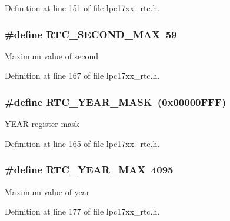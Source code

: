 \-Definition at line 151 of file lpc17xx\-\_\-rtc.\-h.

\hypertarget{group___r_t_c___private___macros_ga60bbeee3abbb647a0daa7c2130965646}{
\subsubsection[{\-R\-T\-C\-\_\-\-S\-E\-C\-O\-N\-D\-\_\-\-M\-A\-X}]{\setlength{\rightskip}{0pt plus 5cm}\#define {\bf \-R\-T\-C\-\_\-\-S\-E\-C\-O\-N\-D\-\_\-\-M\-A\-X}~59}}\label{group___r_t_c___private___macros_ga60bbeee3abbb647a0daa7c2130965646}
\-Maximum value of second 

\-Definition at line 167 of file lpc17xx\-\_\-rtc.\-h.

\hypertarget{group___r_t_c___private___macros_ga35a455a48ccdb557b824e87701449c76}{
\subsubsection[{\-R\-T\-C\-\_\-\-Y\-E\-A\-R\-\_\-\-M\-A\-S\-K}]{\setlength{\rightskip}{0pt plus 5cm}\#define {\bf \-R\-T\-C\-\_\-\-Y\-E\-A\-R\-\_\-\-M\-A\-S\-K}~(0x00000\-F\-F\-F)}}\label{group___r_t_c___private___macros_ga35a455a48ccdb557b824e87701449c76}
\-Y\-E\-A\-R register mask 

\-Definition at line 165 of file lpc17xx\-\_\-rtc.\-h.

\hypertarget{group___r_t_c___private___macros_ga72b68660aec4a924c12a124e2ec5f852}{
\subsubsection[{\-R\-T\-C\-\_\-\-Y\-E\-A\-R\-\_\-\-M\-A\-X}]{\setlength{\rightskip}{0pt plus 5cm}\#define {\bf \-R\-T\-C\-\_\-\-Y\-E\-A\-R\-\_\-\-M\-A\-X}~4095}}\label{group___r_t_c___private___macros_ga72b68660aec4a924c12a124e2ec5f852}
\-Maximum value of year 

\-Definition at line 177 of file lpc17xx\-\_\-rtc.\-h.

